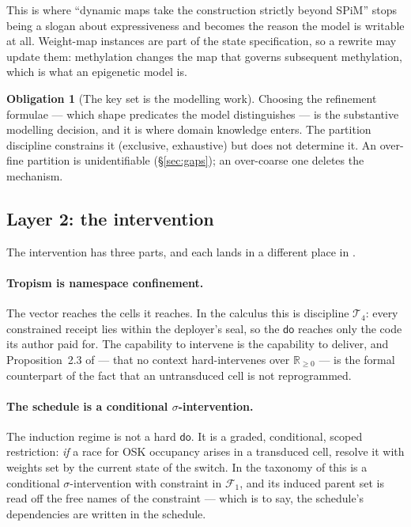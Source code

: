 \documentclass[11pt,a4paper]{article}
\theoremstyle{plain}
\theoremstyle{definition}
\newtheorem{obligation}[theorem]{Obligation}
\theoremstyle{remark}
\newcommand{\Rnn}{\mathbb{R}_{\geq 0}}
\newcommand{\dok}{\textsf{do}}
\begin{document}
This is where ``dynamic maps take the construction strictly beyond SPiM''
\cite{WeightedGSLT} stops being a slogan about expressiveness and becomes the
reason the model is writable at all. Weight-map instances are part of the
state specification, so a rewrite may update them: methylation changes the map
that governs subsequent methylation, which is what an epigenetic model is.

\begin{obligation}[The key set is the modelling work]\label{ob:keys}
Choosing the refinement formulae --- which shape predicates the model
distinguishes --- is the substantive modelling decision, and it is where
domain knowledge enters. The partition discipline constrains it (exclusive,
exhaustive) but does not determine it. An over-fine partition is
unidentifiable (\S\ref{sec:gaps}); an over-coarse one deletes the mechanism.
\end{obligation}

\subsection{Layer 2: the intervention}

The intervention has three parts, and each lands in a different place in
\cite{Interventions}.

\paragraph{Tropism is namespace confinement.} The vector reaches the cells it
reaches. In the calculus this is discipline $\mathcal{T}_4$: every constrained
receipt lies within the deployer's seal, so the $\dok$ reaches only the code
its author paid for. The capability to intervene is the capability to deliver,
and Proposition~2.3 of \cite{Interventions} --- that no context hard-intervenes
over $\Rnn$ --- is the formal counterpart of the fact that an untransduced cell
is not reprogrammed.

\paragraph{The schedule is a conditional $\sigma$-intervention.} The induction
regime is not a hard $\dok$. It is a graded, conditional, scoped restriction:
\emph{if} a race for OSK occupancy arises in a transduced cell, resolve it
with weights set by the current state of the switch. In the taxonomy of
\cite{Interventions} this is a conditional $\sigma$-intervention with
constraint in $\mathcal{F}_1$, and its induced parent set is read off the free
names of the constraint --- which is to say, the schedule's dependencies are
written in the schedule.
\end{document}
